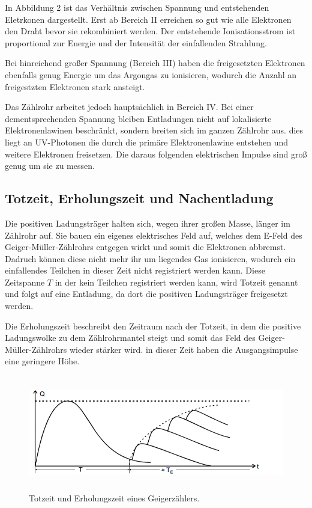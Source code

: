  In Abbildung 2 ist das Verhältnis zwischen Spannung und entstehenden Eletrkonen dargestellt. Erst ab Bereich II
erreichen so gut wie alle Elektronen den Draht bevor sie rekombiniert werden. Der entstehende Ionisationsstrom ist
proportional zur Energie und der Intensität der einfallenden Strahlung.

Bei hinreichend großer Spannung (Bereich III) haben die freigesetzten Elektronen ebenfalls genug Energie um das Argongas zu ionisieren,
wodurch die Anzahl an freigestzten Elektronen stark ansteigt.

Das Zählrohr arbeitet jedoch hauptsächlich in Bereich IV. Bei einer dementsprechenden Spannung bleiben Entladungen nicht
auf lokalisierte Elektronenlawinen beschränkt, sondern breiten sich im ganzen Zählrohr aus. dies liegt
an UV-Photonen die durch die primäre Elektronenlawine entstehen und weitere Elektronen freisetzen. Die
daraus folgenden elektrischen Impulse sind groß genug um sie zu messen.

\subsection{Totzeit, Erholungszeit und Nachentladung}

Die positiven Ladungsträger halten sich, wegen ihrer großen Masse, länger im Zählrohr auf. Sie bauen ein eigenes
elektrisches Feld auf, welches dem E-Feld des Geiger-Müller-Zählrohrs entgegen wirkt und somit die Elektronen abbremst.
Dadruch können diese nicht mehr ihr um liegendes Gas ionisieren, wodurch ein einfallendes Teilchen in dieser Zeit
nicht registriert werden kann. Diese Zeitspanne $T$ in der kein Teilchen registriert werden kann, wird Totzeit genannt
und folgt auf eine Entladung, da dort die positiven Ladungsträger freigesetzt werden.

Die Erholungszeit beschreibt den Zeitraum nach der Totzeit, in dem die positive Ladungswolke zu dem Zählrohrmantel steigt und somit
das Feld des Geiger-Müller-Zählrohrs wieder stärker wird. in dieser Zeit haben die Ausgangsimpulse eine geringere Höhe.


\begin{figure}[H]
  \centering
  \includegraphics[height=5cm]{totzeit.PNG}
  \caption{Totzeit und Erholungszeit eines Geigerzählers. \cite{sample}}
  \label{fig:Linienspektrum}
\end{figure}

